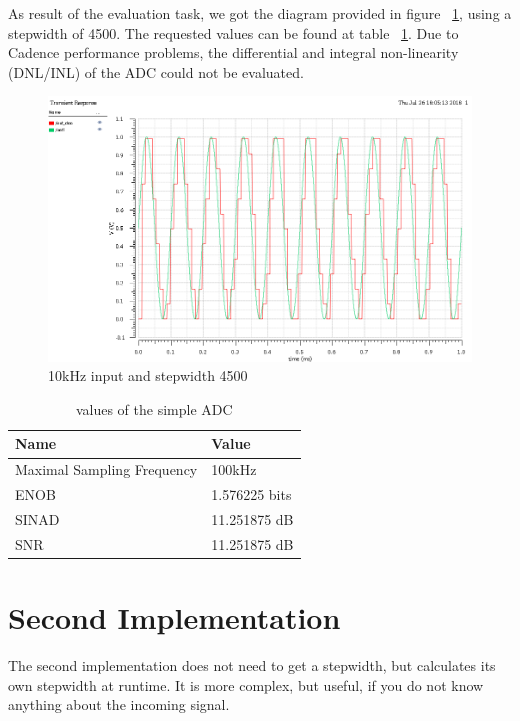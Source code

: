 As result of the evaluation task, we got the diagram provided in figure ~\ref{fig:simpleAdcEvaluation}, using a stepwidth of 4500. The requested values can be found at table ~\ref{table:valuesSimpleADC}. Due to Cadence performance problems, the differential and integral non-linearity (DNL/INL) of the ADC could not be evaluated.

\begin{figure}[!h]
	\centering
	\includegraphics[scale=0.475]{images/adc/10KHzInputStepWidth4500.png}
	\caption{10kHz input and stepwidth 4500}
	\label{fig:simpleAdcEvaluation}
\end{figure}

\begin{table}[!h]
	\centering
	\begin{tabular}{|l|l|}
		\hline
		Name & Value \\
		\hline
		Maximal Sampling Frequency & 100kHz \\
		ENOB & 1.576225 bits \\
		SINAD & 11.251875 dB \\
		SNR & 11.251875 dB \\
		\hline
	\end{tabular}
	\caption{values of the simple ADC}
	\label{table:valuesSimpleADC}
\end{table}

\newpage

\section{Second Implementation}

The second implementation does not need to get a stepwidth, but calculates its own stepwidth at runtime. It is more complex, but useful, if you do not know anything about the incoming signal.

